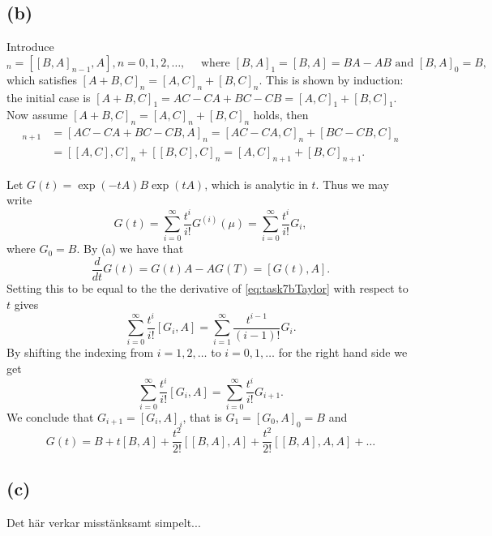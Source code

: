 \subsection*{(b)}
Introduce
\begin{equation}
[B,A]_{n} =  [[B,A]_{n-1},A], n = 0,1,2,\ldots, \quad \text{ where }[B,A]_{1} = [B,A] = BA-AB \text{ and } [B,A]_{0} = B,
\end{equation}
which satisfies $[A+B,C]_{n} = [A,C]_{n} + [B,C]_{n}$. This is shown by induction: the initial case is $[A+B,C]_{1} = AC-CA + BC-CB = [A,C]_{1}+[B,C]_{1}$. Now assume $[A+B,C]_{n} = [A,C]_{n} + [B,C]_{n}$ holds, then
\begin{align}
[A+B,C]_{n+1} &=  [AC-CA + BC-CB,A]_{n} = [AC-CA,C]_{n} + [BC-CB,C]_{n} \\
&= [[A,C],C]_{n} + [[B,C],C]_{n}=[A,C]_{n+1} + [B,C]_{n+1}.
\end{align}


Let $G(t) = \exp(-tA)B\exp(tA)$, which is analytic in $t$. Thus we may write
\begin{equation}
  \label{eq:task7bTaylor}
G(t) = \sum\limits_{i = 0}^{\infty}\frac{t^{i}}{i!} G^{(i)}(\mu)=\sum\limits_{i = 0}^{\infty}\frac{t^{i}}{i!} G_{i},
\end{equation}
where $G_{0} = B$.
By (a) we have that
\begin{equation}
  \frac{d}{dt}G(t) = G(t)A-AG(T) = [G(t),A].
\end{equation}
Setting this to be equal to the the derivative of \eqref{eq:task7bTaylor} with respect to $t$ gives
\begin{equation}
\sum\limits_{i = 0}^{\infty}\frac{t^{i}}{i!} [G_{i},A] = \sum\limits_{i = 1}^{\infty}\frac{t^{i-1}}{(i-1)!} G_{i}.
\end{equation}
By shifting the indexing from $i = 1,2,\ldots $ to $i = 0,1,\ldots$ for the right hand side we get
\begin{equation}
\sum\limits_{i = 0}^{\infty}\frac{t^{i}}{i!} [G_{i},A] = \sum\limits_{i = 0}^{\infty}\frac{t^{i}}{i!} G_{i+1}.
\end{equation}
We conclude that $G_{i+1} = [G_{i},A]_{i}$, that is $G_{1} = [G_{0},A]_{0} = B$ and
\begin{equation}
  G(t) = B + t[B,A]+\frac{t^{2}}{2!}[[B,A],A]+\frac{t^{2}}{2!}[[B,A],A,A]+\ldots
\end{equation}

\subsection*{(c)}
Det här verkar misstänksamt simpelt...

